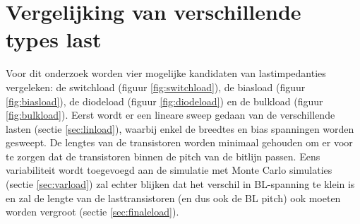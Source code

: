 \section{Vergelijking van verschillende types last}
Voor dit onderzoek worden vier mogelijke kandidaten van lastimpedanties vergeleken: de switchload (figuur \ref{fig:switchload}), de biasload (figuur \ref{fig:biasload}), de diodeload (figuur \ref{fig:diodeload}) en de bulkload (figuur \ref{fig:bulkload})\cite{bulkload}. Eerst wordt er een lineare sweep gedaan van de verschillende lasten (sectie \ref{sec:linload}), waarbij enkel de breedtes en bias spanningen worden gesweept. De lengtes van de transistoren worden minimaal gehouden om er voor te zorgen dat de transistoren binnen de pitch van de bitlijn passen. Eens variabiliteit wordt toegevoegd aan de simulatie met Monte Carlo simulaties (sectie \ref{sec:varload}) zal echter blijken dat het verschil in BL-spanning te klein is en zal de lengte van de lasttransistoren (en dus ook de BL pitch) ook moeten worden vergroot (sectie \ref{sec:finaleload}).

